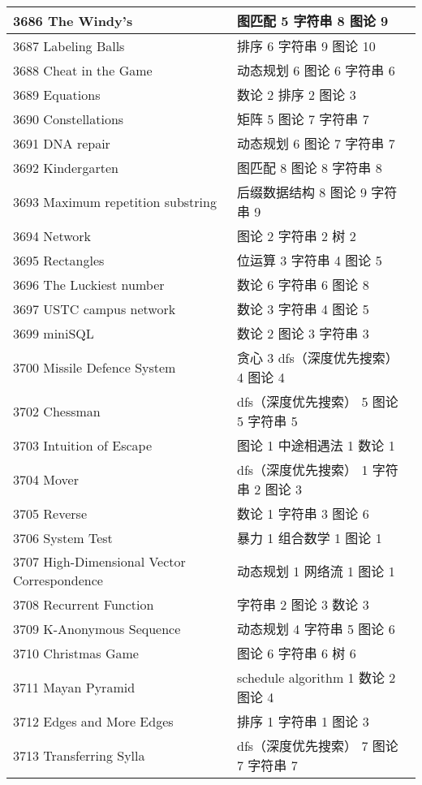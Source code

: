 \begin{longtable}{| p{} | p{} |}
 3686 The Windy's  & 图匹配 5 字符串 8 图论 9 \\ \hline
 3687 Labeling Balls  & 排序 6 字符串 9 图论 10 \\ \hline
 3688 Cheat in the Game  & 动态规划 6 图论 6 字符串 6 \\ \hline
 3689 Equations  & 数论 2 排序 2 图论 3 \\ \hline
 3690 Constellations  & 矩阵 5 图论 7 字符串 7 \\ \hline
 3691 DNA repair  & 动态规划 6 图论 7 字符串 7 \\ \hline
 3692 Kindergarten  & 图匹配 8 图论 8 字符串 8 \\ \hline
 3693 Maximum repetition substring  & 后缀数据结构 8 图论 9 字符串 9 \\ \hline
 3694 Network  & 图论 2 字符串 2 树 2 \\ \hline
 3695 Rectangles  & 位运算 3 字符串 4 图论 5 \\ \hline
 3696 The Luckiest number  & 数论 6 字符串 6 图论 8 \\ \hline
 3697 USTC campus network  & 数论 3 字符串 4 图论 5 \\ \hline
 3699 miniSQL  & 数论 2 图论 3 字符串 3 \\ \hline
 3700 Missile Defence System  & 贪心 3 dfs（深度优先搜索） 4 图论 4 \\ \hline
 3702 Chessman  & dfs（深度优先搜索） 5 图论 5 字符串 5 \\ \hline
 3703 Intuition of Escape  & 图论 1 中途相遇法 1 数论 1 \\ \hline
 3704 Mover  & dfs（深度优先搜索） 1 字符串 2 图论 3 \\ \hline
 3705 Reverse  & 数论 1 字符串 3 图论 6 \\ \hline
 3706 System Test  & 暴力 1 组合数学 1 图论 1 \\ \hline
 3707 High-Dimensional Vector Correspondence  & 动态规划 1 网络流 1 图论 1 \\ \hline
 3708 Recurrent Function  & 字符串 2 图论 3 数论 3 \\ \hline
 3709 K-Anonymous Sequence  & 动态规划 4 字符串 5 图论 6 \\ \hline
 3710 Christmas Game  & 图论 6 字符串 6 树 6 \\ \hline
 3711 Mayan Pyramid  & schedule algorithm 1 数论 2 图论 4 \\ \hline
 3712 Edges and More Edges  & 排序 1 字符串 1 图论 3 \\ \hline
 3713 Transferring Sylla  & dfs（深度优先搜索） 7 图论 7 字符串 7 \\ \hline

\end{longtable}

